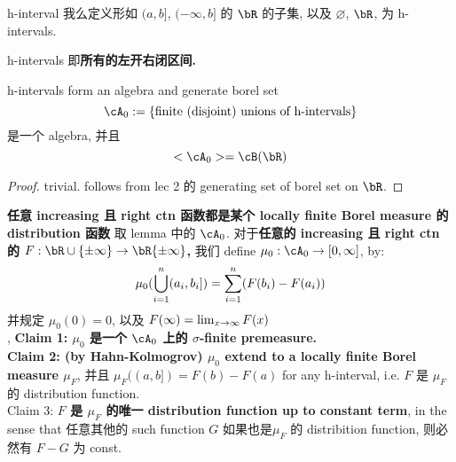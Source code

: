 \documentclass[lang=cn,11pt]{elegantbook}
\begin{document}
\begin{definition}{h-interval}
    我么定义形如 $(a,b]$, $(-\infty, b]$ 的 $\bR$  的子集, 以及 $\varnothing$, $\bR$, 为 h-intervals.
\end{definition}
h-intervals 即\textbf{所有的左开右闭区间.}


\begin{lemma}{h-intervals form an algebra and generate borel set}
    $$
    \cA_0 := \{  \text{finite (disjoint) unions of h-intervals}\}
    $$
是一个 algebra, 并且
$$
<\cA_0> = \cB(\bR)
$$
\end{lemma}
\begin{proof}
    trivial. follows from lec 2 的 generating set of borel set on $\bR$.
\end{proof}




\begin{theorem}{\textbf{任意 increasing 且 right ctn 函数都是某个 locally finite Borel measure 的 distribution 函数}}
取 lemma 中的 $\cA_0$.
对于\textbf{任意的 increasing 且 right ctn 的 $F: \bR \cup \{\pm\infty\} \rar \bR\{\pm\infty\}$,} 我们 define $\mu_0: \cA_0 \rar [0,\infty]$, by:
$$
\mu_0(\bigcup_{i=1}^n (a_i, b_i]) = \sum_{i=1}^n (F(b_i) - F(a_i))
$$ 并规定 $\mu_0(0) = 0$, 以及 $F(\infty) = \lim_{x\rightarrow \infty } F(x)$\\,
\textbf{Claim 1: $\mu_0$ 是一个 $\cA_0$ 上的 $\sigma$-finite premeasure.}\\
\textbf{Claim 2: (by Hahn-Kolmogrov) $\mu_0$ extend to a locally finite Borel measure $\mu_F$}, 并且 $\mu_F ((a,b]) = F(b) - F(a)$ for any h-interval, i.e. $F$ 是 $\mu_F$ 的 distribution function.\\
Claim 3: \textbf{$F$ 是 $\mu_F$ 的唯一 distribution function up to constant term}, in the sense that 任意其他的 such function $G$ 如果也是$\mu_F$ 的 distribition function, 则必然有 $F-G$ 为 const. 
\end{theorem}
\end{document}
